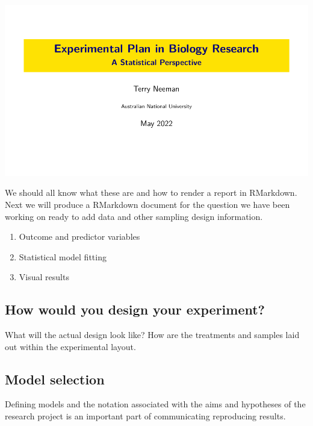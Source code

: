 \documentclass[
]{book}
\providecommand{\tightlist}{%
  \setlength{\itemsep}{0pt}\setlength{\parskip}{0pt}}
\begin{document}
\begin{center}\includegraphics{study_experiment_design/Experimental-plan-workshop Terry Neeman 17 May 2002} \end{center}

We should all know what these are and how to render a report in RMarkdown. Next we will produce a RMarkdown document for the question we have been working on ready to add data and other sampling design information.

\begin{enumerate}
\def\labelenumi{\arabic{enumi}.}
\tightlist
\item
  Outcome and predictor variables
\item
  Statistical model fitting
\item
  Visual results
\end{enumerate}

\hypertarget{how-would-you-design-your-experiment}{%
\subsection{How would you design your experiment?}\label{how-would-you-design-your-experiment}}

What will the actual design look like? How are the treatments and samples laid out within the experimental layout.

\hypertarget{model-selection}{%
\subsection{Model selection}\label{model-selection}}

Defining models and the notation associated with the aims and hypotheses of the research project is an important part of communicating reproducing results.
\end{document}
